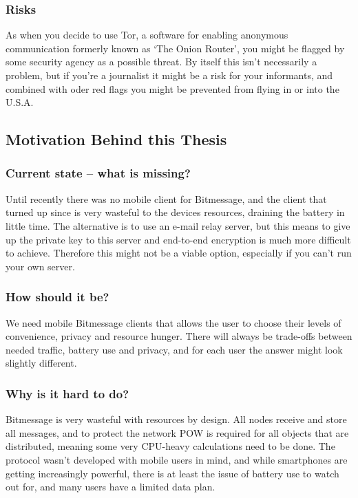 \documentclass{bfh}
\begin{document}
  \subsubsection{Risks}
  As when you decide to use Tor, a software for enabling anonymous communication formerly known as `The Onion Router', you might be flagged by some security agency as a possible threat.\cite{wired:tor} By itself this isn't necessarily a problem, but if you're a journalist it might be a risk for your informants, and combined with oder red flags you might be prevented from flying in or into the U.S.A.


  \subsection{Motivation Behind this Thesis}
  \subsubsection{Current state -- what is missing?}
  Until recently there was no mobile client for Bitmessage, and the client that turned up since is very wasteful to the devices resources, draining the battery in little time. The alternative is to use an e-mail relay server, but this means to give up the private key to this server and end-to-end encryption is much more difficult to achieve. Therefore this might not be a viable option, especially if you can't run your own server.

  \subsubsection{How should it be?}
  We need mobile Bitmessage clients that allows the user to choose their levels of convenience, privacy and resource hunger. There will always be trade-offs between needed traffic, battery use and privacy, and for each user the answer might look slightly different.

  \subsubsection{Why is it hard to do?}
  Bitmessage is very wasteful with resources by design. All nodes receive and store all messages, and to protect the network \ac{POW} is required for all objects that are distributed, meaning some very \acs{CPU}-heavy calculations need to be done. The protocol wasn't developed with mobile users in mind, and while smartphones are getting increasingly powerful, there is at least the issue of battery use to watch out for, and many users have a limited data plan.
\end{document}
